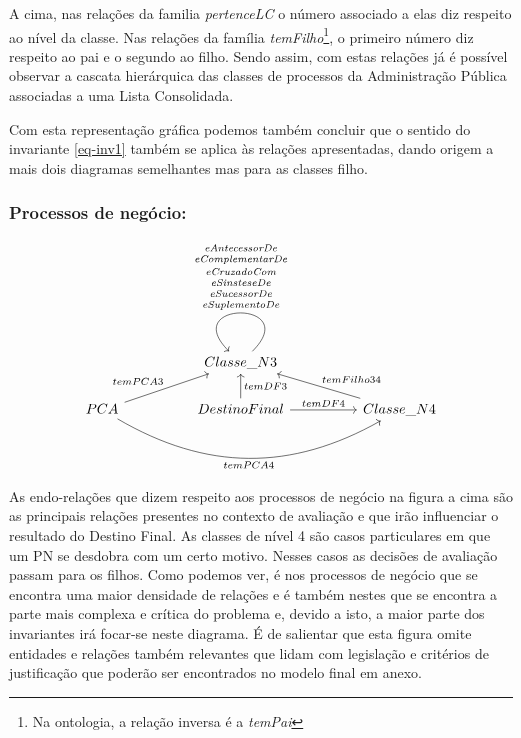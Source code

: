 \documentclass[tikz,runningheads,a4paper]{llncs}
\begin{document}
A cima, nas relações da familia \textit{pertenceLC} o número associado a elas diz respeito ao nível da classe. Nas relações da família \textit{temFilho}\footnote{Na ontologia, a relação inversa é a \textit{temPai}}, o primeiro número diz respeito ao pai e o segundo ao filho. Sendo assim, com estas relações já é possível observar a cascata hierárquica das classes de processos da Administração Pública associadas a uma Lista Consolidada.

Com esta representação gráfica podemos também concluir que o sentido do invariante \ref{eq-inv1} também se aplica às relações apresentadas, dando origem a mais dois diagramas semelhantes mas para as classes filho.

\subsubsection{Processos de negócio:}

\begin{equation}
\label{vis_pn}
\begin{tikzcd}
            &  & Classe\_N3 \arrow[loop,swap]{u}{\textit{\shortstack{eAntecessorDe \\ eComplementarDe \\ eCruzadoCom \\ eSinsteseDe \\ eSucessorDe \\ eSuplementoDe}}}                       &  &                                       \\
PCA \arrow{rru}{temPCA3} \arrow[swap, bend right]{rrrr}{temPCA4} &  & DestinoFinal \arrow[swap]{u}{temDF3} \arrow{rr}{temDF4} &  & Classe\_N4 \arrow[swap]{llu}{temFilho34}
\end{tikzcd}
\end{equation}

As endo-relações que dizem respeito aos processos de negócio na figura a cima são as principais relações presentes no contexto de avaliação e que irão influenciar o resultado do Destino Final. As classes de nível 4 são casos particulares em que um PN se desdobra com um certo motivo. Nesses casos as decisões de avaliação passam para os filhos. Como podemos ver, é nos processos de negócio que se encontra uma maior densidade de relações e é também nestes que se encontra a parte mais complexa e crítica do problema e, devido a isto, a maior parte dos invariantes irá focar-se neste diagrama. É de salientar que esta figura omite entidades e relações também relevantes que lidam com legislação e critérios de justificação que poderão ser encontrados no modelo final em anexo.
\end{document}
